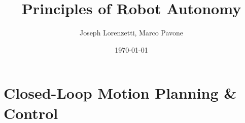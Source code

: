 \documentclass[nohyper,nobib]{tufte-book}
\title{Principles of Robot Autonomy}
\author{Joseph Lorenzetti, Marco Pavone}
\date{\today}
\begin{document}
\chapter{Closed-Loop Motion Planning \& Control}


\printbibliography
\end{document}
